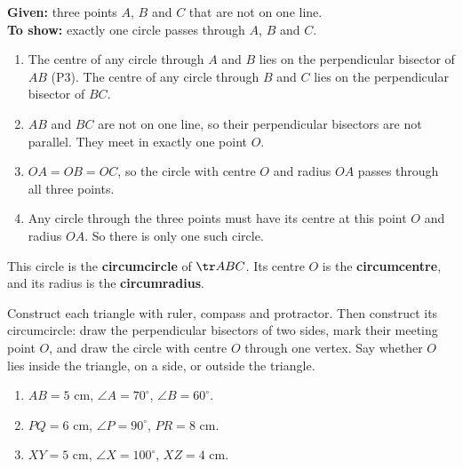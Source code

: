 
\why
\textbf{Given:} three points $A$, $B$ and $C$ that are not on one line.\\
\textbf{To show:} exactly one circle passes through $A$, $B$ and $C$.
\begin{enumerate}[leftmargin=1.8em,itemsep=1pt]
  \item The centre of any circle through $A$ and $B$ lies on the perpendicular bisector of $AB$ (P3). The centre of any circle through $B$ and $C$ lies on the perpendicular bisector of $BC$.
  \item $AB$ and $BC$ are not on one line, so their perpendicular bisectors are not parallel. They meet in exactly one point $O$.
  \item $OA=OB=OC$, so the circle with centre $O$ and radius $OA$ passes through all three points.
  \item Any circle through the three points must have its centre at this point $O$ and radius $OA$. So there is only one such circle.
\end{enumerate}

This circle is the \textbf{circumcircle} of $\tr ABC$. Its centre $O$ is the \textbf{circumcentre}, and its radius is the \textbf{circumradius}.

\begin{solvefirst}
  \item Construct each triangle with ruler, compass and protractor. Then construct its circumcircle: draw the perpendicular bisectors of two sides, mark their meeting point $O$, and draw the circle with centre $O$ through one vertex. Say whether $O$ lies inside the triangle, on a side, or outside the triangle.
  \begin{enumerate}[label=(\alph*),itemsep=1pt]
    \item $AB=5$ cm, $\angle A=70^\circ$, $\angle B=60^\circ$.
    \item $PQ=6$ cm, $\angle P=90^\circ$, $PR=8$ cm.
    \item $XY=5$ cm, $\angle X=100^\circ$, $XZ=4$ cm.
  \end{enumerate}
\end{solvefirst}

